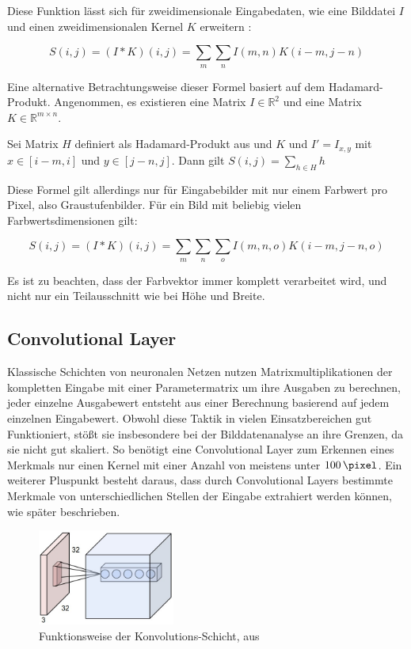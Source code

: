 Diese Funktion lässt sich für zweidimensionale Eingabedaten, wie \zB eine Bilddatei $I$ und einen zweidimensionalen Kernel $K$ erweitern \cite[Kap.~9]{deeplearning_16}:

\begin{equation}
S(i,j) = (I*K)(i,j) = \sum_{m}\sum_{n}I(m,n)K(i-m,j-n)
\end{equation}

Eine alternative Betrachtungsweise dieser Formel basiert auf dem Hadamard-Produkt. Angenommen, es existieren eine Matrix $I\in\mathbb{R}^{2}$ und eine Matrix $K\in\mathbb{R}^{m\times n}$.

Sei Matrix $H$ definiert als Hadamard-Produkt aus und $K$ und $I'=I_{x, y}$ mit $x\in[i-m,i]$ und $y\in[j-n,j]$.
Dann gilt $S(i,j)=\sum_{h\in H}h$

Diese Formel gilt allerdings nur für Eingabebilder mit nur einem Farbwert pro Pixel, also Graustufenbilder. Für ein Bild mit beliebig vielen Farbwertsdimensionen gilt:

\begin{equation}
S(i,j) = (I*K)(i,j) = \sum_{m}\sum_{n}\sum_{o}I(m,n,o)K(i-m,j-n,o)
\end{equation}

Es ist zu beachten, dass der Farbvektor immer komplett verarbeitet wird, und nicht nur ein Teilausschnitt wie bei Höhe und Breite.

\subsection{Convolutional Layer}
\label{ssec:convlayer}

Klassische Schichten von neuronalen Netzen nutzen Matrixmultiplikationen der kompletten Eingabe mit einer Parametermatrix um ihre Ausgaben zu berechnen, \dh jeder einzelne Ausgabewert entsteht aus einer Berechnung basierend auf jedem einzelnen Eingabewert. Obwohl diese Taktik in vielen Einsatzbereichen gut Funktioniert, stößt sie insbesondere bei der Bilddatenanalyse an ihre Grenzen, da sie nicht gut skaliert. \cite{cs231n} So benötigt eine Convolutional Layer zum Erkennen eines Merkmals nur einen Kernel mit einer Anzahl von meistens unter $\SI{100}{\pixel}$. \cite{deeplearning_16} Ein weiterer Pluspunkt besteht daraus, dass durch Convolutional Layers bestimmte Merkmale von unterschiedlichen Stellen der Eingabe extrahiert werden können, wie später beschrieben.

\begin{figure}[H]
	\centering
	\includegraphics[width=0.4\textwidth,keepaspectratio]{images/cs231n/convolutional.jpg}
	\caption{Funktionsweise der Konvolutions-Schicht, aus \cite{cs231n}}
	\label{fig:convolutional}
\end{figure}

